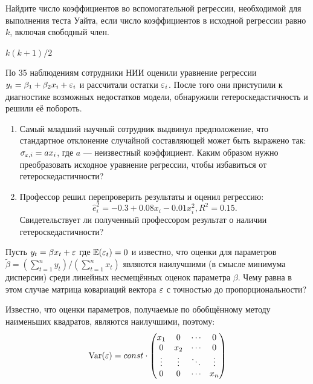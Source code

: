 \begin{problem}
Найдите число коэффициентов во вспомогательной регрессии, необходимой для выполнения теста Уайта, если число коэффициентов в исходной регрессии равно $k$, включая свободный член.


\begin{sol}
$k(k+1)/2$
\end{sol}
\end{problem}


\begin{problem}
По 35 наблюдениям сотрудники НИИ оценили уравнение регрессии $y_i = \beta_1 + \beta_2 x_i + \varepsilon_i$ и рассчитали остатки $\varepsilon_i$. После того они приступили к диагностике возможных недостатков модели, обнаружили гетероскедастичность и решили её побороть.
\begin{enumerate}
\item Самый младший научный сотрудник выдвинул предположение, что стандартное отклонение случайной составляющей может быть выражено так: $\sigma_{\varepsilon, i} = a x_i$, где $a$ — неизвестный коэффициент. Каким образом нужно преобразовать исходное уравнение регрессии, чтобы избавиться от гетероскедастичности?
\item Профессор решил перепроверить результаты и оценил регрессию:
\[
\hat{e}_i^2 = -0.3 + 0.08 x_i - 0.01 x_i^2, R^2 = 0.15.
\]
Свидетельствует ли полученный профессором результат о наличии гетероскедастичности?
\end{enumerate}


\begin{sol}
\end{sol}
\end{problem}



\begin{problem}
Пусть $y_t = \beta x_t + \varepsilon$ где $\mathbb{E}(\varepsilon_t) = 0$ и известно, что оценки для параметров $\tilde{\beta} = \left( \sum_{t=1}^n y_t \right)/\left( \sum_{t=1}^n x_t \right)$ являются наилучшими (в смысле минимума дисперсии) среди линейных несмещённых оценок параметра $\beta$. 
Чему равна в этом случае матрица ковариаций вектора $\varepsilon$ с точностью до пропорциональности?



\begin{sol}
Известно, что оценки параметров, получаемые по обобщённому методу наименьших квадратов, являются наилучшими, поэтому:
\[
\operatorname{Var}(\varepsilon) = const \cdot 
\begin{pmatrix}
x_1     & 0      & \cdots & 0 \\
0       & x_2    & \cdots & 0 \\
\vdots  & \vdots & \ddots & \vdots \\
0       & 0      & \cdots & x_n \\
\end{pmatrix}
\]
\end{sol}
\end{problem}


